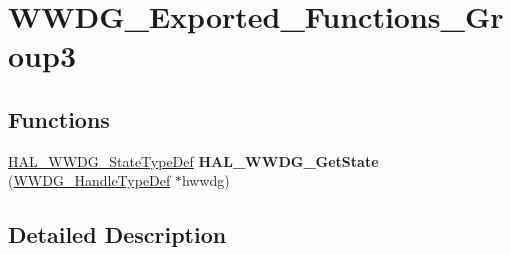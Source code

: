 \hypertarget{group___w_w_d_g___exported___functions___group3}{}\section{W\+W\+D\+G\+\_\+\+Exported\+\_\+\+Functions\+\_\+\+Group3}
\label{group___w_w_d_g___exported___functions___group3}
\subsection*{Functions}
\begin{DoxyCompactItemize}
\item 
\hyperlink{group___w_w_d_g___exported___types_ga0dbbade5e745711745e5f9cc10991301}{H\+A\+L\+\_\+\+W\+W\+D\+G\+\_\+\+State\+Type\+Def} {\bfseries H\+A\+L\+\_\+\+W\+W\+D\+G\+\_\+\+Get\+State} (\hyperlink{struct_w_w_d_g___handle_type_def}{W\+W\+D\+G\+\_\+\+Handle\+Type\+Def} $\ast$hwwdg)\hypertarget{group___w_w_d_g___exported___functions___group3_ga893774ecf63a6f78ef41f414db80ee46}{}\label{group___w_w_d_g___exported___functions___group3_ga893774ecf63a6f78ef41f414db80ee46}

\end{DoxyCompactItemize}


\subsection{Detailed Description}
